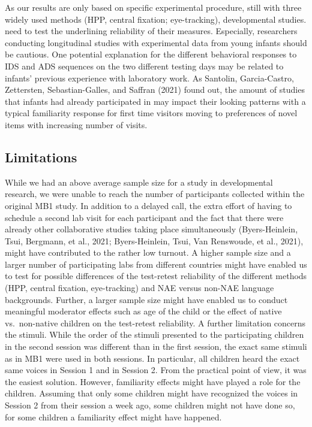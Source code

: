 \documentclass[
  english,
  man,floatsintext]{apa6}
\begin{document}
As our results are only based on specific experimental procedure, still with three widely used methods (HPP, central fixation; eye-tracking), developmental studies. need to test the underlining reliability of their measures. Especially, researchers conducting longitudinal studies with experimental data from young infants should be cautious.
One potential explanation for the different behavioral responses to IDS and ADS sequences on the two different testing days may be related to infants' previous experience with laboratory work. As Santolin, Garcia-Castro, Zettersten, Sebastian-Galles, and Saffran (2021) found out, the amount of studies that infants had already participated in may impact their looking patterns with a typical familiarity response for first time visitors moving to preferences of novel items with increasing number of visits.

\hypertarget{limitations}{%
\subsection{Limitations}\label{limitations}}

While we had an above average sample size for a study in developmental research, we were unable to reach the number of participants collected within the original MB1 study. In addition to a delayed call, the extra effort of having to schedule a second lab visit for each participant and the fact that there were already other collaborative studies taking place simultaneously (Byers-Heinlein, Tsui, Bergmann, et al., 2021; Byers-Heinlein, Tsui, Van Renswoude, et al., 2021), might have contributed to the rather low turnout. A higher sample size and a larger number of participating labs from different countries might have enabled us to test for possible differences of the test-retest reliability of the different methods (HPP, central fixation, eye-tracking) and NAE versus non-NAE language backgrounds. Further, a larger sample size might have enabled us to conduct meaningful moderator effects such as age of the child or the effect of native vs.~non-native children on the test-retest reliability.
A further limitation concerns the stimuli. While the order of the stimuli presented to the participating children in the second session was different than in the first session, the exact same stimuli as in MB1 were used in both sessions. In particular, all children heard the exact same voices in Session 1 and in Session 2. From the practical point of view, it was the easiest solution. However, familiarity effects might have played a role for the children. Assuming that only some children might have recognized the voices in Session 2 from their session a week ago, some children might not have done so, for some children a familiarity effect might have happened.
\end{document}
